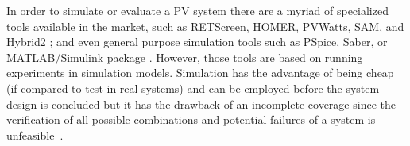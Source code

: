 \documentclass[review]{elsarticle}
\begin{document}
In order to simulate or evaluate a PV system there are a myriad of specialized tools available in the market, such as RETScreen, HOMER, PVWatts, SAM, and Hybrid2 \cite{Pradhan,Swarnkar,NRELDobos,NRELBlair,Mills}; and even general purpose simulation tools such as PSpice, Saber, or MATLAB/Simulink package \cite{Gow1999,Benatiallah2017}.
%
%
%
%
%
However, those tools are based on running experiments in simulation models. Simulation has the advantage of being cheap (if compared to test in real systems) and can be employed before the system design is concluded but it has the drawback of an incomplete coverage since the verification of all possible combinations and potential failures of a system is unfeasible~\cite{ClarkeHV18}.
\end{document}
